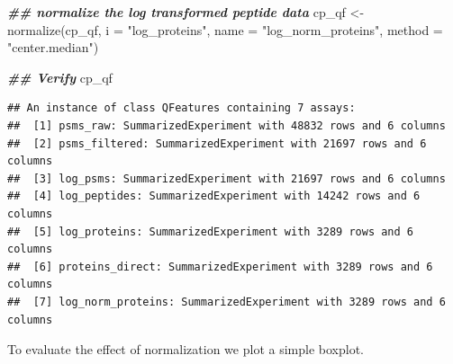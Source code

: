 \documentclass[9pt,a4paper,]{extarticle}
\newenvironment{Shaded}{\begin{snugshade}}{\end{snugshade}}
\newcommand{\AttributeTok}[1]{\textcolor[rgb]{0.77,0.63,0.00}{#1}}
\newcommand{\DocumentationTok}[1]{\textcolor[rgb]{0.56,0.35,0.01}{\textbf{\textit{#1}}}}
\newcommand{\FunctionTok}[1]{\textcolor[rgb]{0.00,0.00,0.00}{#1}}
\newcommand{\NormalTok}[1]{#1}
\newcommand{\OtherTok}[1]{\textcolor[rgb]{0.56,0.35,0.01}{#1}}
\newcommand{\StringTok}[1]{\textcolor[rgb]{0.31,0.60,0.02}{#1}}
\begin{document}
\begin{Shaded}
\begin{Highlighting}[]
\DocumentationTok{\#\# normalize the log transformed peptide data}
\NormalTok{cp\_qf }\OtherTok{\textless{}{-}} \FunctionTok{normalize}\NormalTok{(cp\_qf,}
                   \AttributeTok{i =} \StringTok{"log\_proteins"}\NormalTok{,}
                   \AttributeTok{name =} \StringTok{"log\_norm\_proteins"}\NormalTok{,}
                   \AttributeTok{method =} \StringTok{"center.median"}\NormalTok{)}

\DocumentationTok{\#\# Verify}
\NormalTok{cp\_qf}
\end{Highlighting}
\end{Shaded}

\begin{verbatim}
## An instance of class QFeatures containing 7 assays:
##  [1] psms_raw: SummarizedExperiment with 48832 rows and 6 columns 
##  [2] psms_filtered: SummarizedExperiment with 21697 rows and 6 columns 
##  [3] log_psms: SummarizedExperiment with 21697 rows and 6 columns 
##  [4] log_peptides: SummarizedExperiment with 14242 rows and 6 columns 
##  [5] log_proteins: SummarizedExperiment with 3289 rows and 6 columns 
##  [6] proteins_direct: SummarizedExperiment with 3289 rows and 6 columns 
##  [7] log_norm_proteins: SummarizedExperiment with 3289 rows and 6 columns
\end{verbatim}

To evaluate the effect of normalization we plot a simple boxplot.
\end{document}
